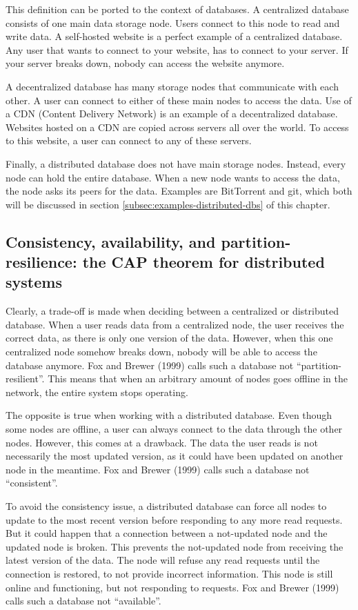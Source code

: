 This definition can be ported to the context of databases. A centralized database consists of one main data storage node. Users connect to this node to read and write data. A self-hosted website is a perfect example of a centralized database. Any user that wants to connect to your website, has to connect to your server. If your server breaks down, nobody can access the website anymore.

A decentralized database has many storage nodes that communicate with each other. A user can connect to either of these main nodes to access the data. Use of a CDN (Content Delivery Network) is an example of a decentralized database. Websites hosted on a CDN are copied across servers all over the world. To access to this website, a user can connect to any of these servers.

Finally, a distributed database does not have main storage nodes. Instead, every node can hold the entire database. When a new node wants to access the data, the node asks its peers for the data. Examples are BitTorrent and git, which both will be discussed in section \ref{subsec:examples-distributed-dbs} of this chapter.

\subsection{Consistency, availability, and partition-resilience: the CAP theorem for distributed systems}

Clearly, a trade-off is made when deciding between a centralized or distributed database. When a user reads data from a centralized node, the user receives the correct data, as there is only one version of the data. However, when this one centralized node somehow breaks down, nobody will be able to access the database anymore. Fox and Brewer (1999) \cite{brewers-theorem-paper} calls such a database not ``partition-resilient''. This means that when an arbitrary amount of nodes goes offline in the network, the entire system stops operating.

The opposite is true when working with a distributed database. Even though some nodes are offline, a user can always connect to the data through the other nodes. However, this comes at a drawback. The data the user reads is not necessarily the most updated version, as it could have been updated on another node in the meantime. Fox and Brewer (1999) calls such a database not ``consistent''.

To avoid the consistency issue, a distributed database can force all nodes to update to the most recent version before responding to any more read requests. But it could happen that a connection between a not-updated node and the updated node is broken. This prevents the not-updated node from receiving the latest version of the data. The node will refuse any read requests until the connection is restored, to not provide incorrect information. This node is still online and functioning, but not responding to requests. Fox and Brewer (1999) calls such a database not ``available''.

